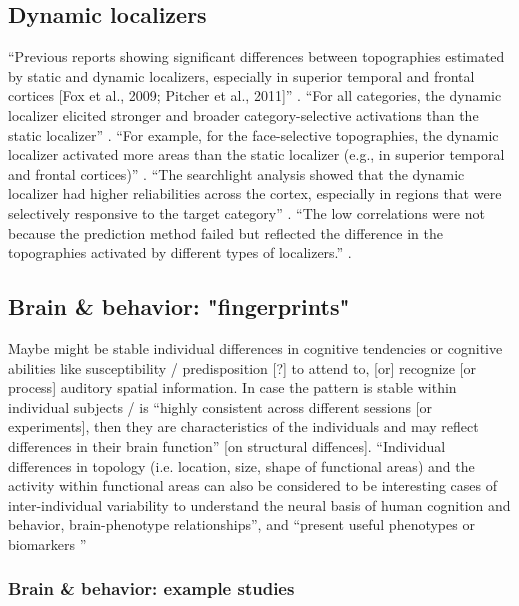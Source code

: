 \subsection{Dynamic localizers}
%
``Previous reports showing significant differences between topographies
estimated by static and dynamic localizers, especially in superior temporal and
frontal cortices [Fox et al., 2009; Pitcher et al., 2011]''
\citep{jiahui2022cross}.
%
``For all categories, the dynamic localizer elicited stronger and broader
category-selective activations than the static localizer''
\citep{jiahui2022cross}.
%
``For example, for the face-selective topographies, the dynamic localizer
activated more areas than the static localizer (e.g., in superior temporal and
frontal cortices)'' \citep{jiahui2022cross}.
%
``The searchlight analysis showed that the dynamic localizer had higher
reliabilities across the cortex, especially in regions that were selectively
responsive to the target category'' \citep{jiahui2022cross}.
%
``The low correlations were not because the prediction method failed but
reflected the difference in the topographies activated by different types of
localizers.'' \citep{jiahui2022cross}.


\subsection{Brain \& behavior: "fingerprints"}


%
Maybe might be stable individual differences in cognitive tendencies or
cognitive abilities like susceptibility / predisposition [?] to attend to, [or]
recognize [or process] auditory spatial information.
In case the pattern is stable within individual subjects / is ``highly
consistent across different sessions [or experiments], then they are
characteristics of the individuals and may reflect differences in their brain
function'' \citep{kanai2011structural} [on structural diffences].
%
``Individual differences in topology (i.e. location, size, shape of functional
areas) and the activity within functional areas can also be considered to be
interesting cases of inter-individual variability to understand the neural basis
of human cognition and behavior, brain-phenotype relationships'', and ``present
useful phenotypes or biomarkers \citep{glasser2016multi,
vanhorn2008individual}''


\subsubsection{Brain \& behavior: example studies}


